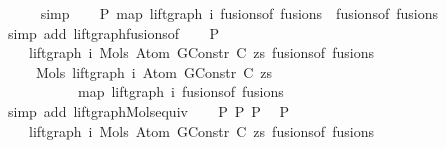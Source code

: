 \begin{isabellebody}
\ \ \ \ \isamarkupfalse%
\ simp\isanewline
\isanewline
\ \ \isamarkupfalse%
\ P{}{\isacharcolon}{\kern0pt}\ {\isachardoublequoteopen}map\ {\isacharparenleft}{\kern0pt}lift{\isacharunderscore}{\kern0pt}graph\ i{\isacharparenright}{\kern0pt}\ {\isacharparenleft}{\kern0pt}fusions{\isacharunderscore}{\kern0pt}of\ fusions{\isacharparenright}{\kern0pt}\ {\isacharequal}{\kern0pt}\ fusions{\isacharunderscore}{\kern0pt}of\ fusions{\isachardoublequoteclose}\isanewline
\ \ \ \ \isamarkupfalse%
\ {\isacharparenleft}{\kern0pt}simp\ add{\isacharcolon}{\kern0pt}\ lift{\isacharunderscore}{\kern0pt}graph{\isacharunderscore}{\kern0pt}fusions{\isacharunderscore}{\kern0pt}of{\isacharparenright}{\kern0pt}\isanewline
\isanewline
\ \ \isamarkupfalse%
\ P{}{\isacharcolon}{\kern0pt}\isanewline
\ \ \ \ {\isachardoublequoteopen}lift{\isacharunderscore}{\kern0pt}graph\ i\ {\isacharparenleft}{\kern0pt}Mols{}\ {\isacharparenleft}{\kern0pt}Atom\ {\isacharparenleft}{\kern0pt}GConstr\ C{\isacharparenright}{\kern0pt}\ zs{\isacharparenright}{\kern0pt}\ {\isacharparenleft}{\kern0pt}fusions{\isacharunderscore}{\kern0pt}of\ fusions{\isacharparenright}{\kern0pt}{\isacharparenright}{\kern0pt}\ {\isacharequal}{\kern0pt}\isanewline
\ \ \ \ \ Mols{}\ {\isacharparenleft}{\kern0pt}lift{\isacharunderscore}{\kern0pt}graph\ i\ {\isacharparenleft}{\kern0pt}Atom\ {\isacharparenleft}{\kern0pt}GConstr\ C{\isacharparenright}{\kern0pt}\ zs{\isacharparenright}{\kern0pt}{\isacharparenright}{\kern0pt}\isanewline
\ \ \ \ \ \ \ \ \ \ \ {\isacharparenleft}{\kern0pt}map\ {\isacharparenleft}{\kern0pt}lift{\isacharunderscore}{\kern0pt}graph\ i{\isacharparenright}{\kern0pt}\ {\isacharparenleft}{\kern0pt}fusions{\isacharunderscore}{\kern0pt}of\ fusions{\isacharparenright}{\kern0pt}{\isacharparenright}{\kern0pt}{\isachardoublequoteclose}\isanewline
\ \ \ \ \isamarkupfalse%
\ {\isacharparenleft}{\kern0pt}simp\ add{\isacharcolon}{\kern0pt}\ lift{\isacharunderscore}{\kern0pt}graph{\isacharunderscore}{\kern0pt}Mols{}{\isacharunderscore}{\kern0pt}equiv{\isacharparenright}{\kern0pt}\isanewline
\isanewline
\ \ \isamarkupfalse%
\ P{}\ P{}\ P{}\ \isamarkupfalse%
\ P{}{\isacharcolon}{\kern0pt}\isanewline
\ \ \ \ {\isachardoublequoteopen}lift{\isacharunderscore}{\kern0pt}graph\ i\ {\isacharparenleft}{\kern0pt}Mols{}\ {\isacharparenleft}{\kern0pt}Atom\ {\isacharparenleft}{\kern0pt}GConstr\ C{\isacharparenright}{\kern0pt}\ zs{\isacharparenright}{\kern0pt}\ {\isacharparenleft}{\kern0pt}fusions{\isacharunderscore}{\kern0pt}of\ fusions{\isacharparenright}{\kern0pt}{\isacharparenright}{\kern0pt}\ {\isacharequal}{\kern0pt}\isanewline

\end{isabellebody}
